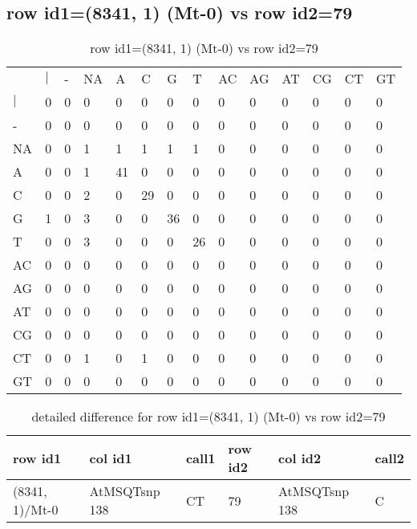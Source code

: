\subsection{row id1=(8341, 1) (Mt-0) vs row id2=79}
\begin{center}
\begin{longtable}{|l|l|l|l|l|l|l|l|l|l|l|l|l|l|}
\caption{row id1=(8341, 1) (Mt-0) vs row id2=79} \label{table_dm544}\\
\hline
\\
\hline
&$|$&-&NA&A&C&G&T&AC&AG&AT&CG&CT&GT\\
$|$&0&0&0&0&0&0&0&0&0&0&0&0&0\\
-&0&0&0&0&0&0&0&0&0&0&0&0&0\\
NA&0&0&1&1&1&1&1&0&0&0&0&0&0\\
A&0&0&1&41&0&0&0&0&0&0&0&0&0\\
C&0&0&2&0&29&0&0&0&0&0&0&0&0\\
G&1&0&3&0&0&36&0&0&0&0&0&0&0\\
T&0&0&3&0&0&0&26&0&0&0&0&0&0\\
AC&0&0&0&0&0&0&0&0&0&0&0&0&0\\
AG&0&0&0&0&0&0&0&0&0&0&0&0&0\\
AT&0&0&0&0&0&0&0&0&0&0&0&0&0\\
CG&0&0&0&0&0&0&0&0&0&0&0&0&0\\
CT&0&0&1&0&1&0&0&0&0&0&0&0&0\\
GT&0&0&0&0&0&0&0&0&0&0&0&0&0\\
\hline
\end{longtable}
\end{center}

\begin{center}
\begin{longtable}{|l|l|l|l|l|l|}
\caption{detailed difference for row id1=(8341, 1) (Mt-0) vs row id2=79} \label{table_dm545}\\
\hline
row id1&col id1&call1&row id2&col id2&call2\\
\hline
(8341, 1)/Mt-0&AtMSQTsnp 138&CT&79&AtMSQTsnp 138&C\\
\hline
\end{longtable}
\end{center}

